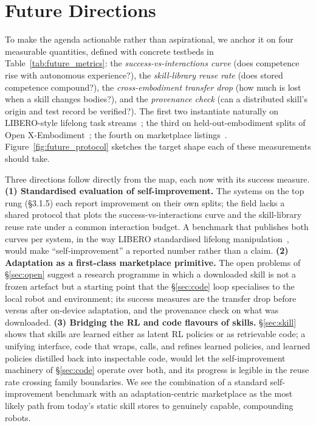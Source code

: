 \section{Future Directions}
\label{sec:future}

To make the agenda actionable rather than aspirational, we anchor it on four measurable
quantities, defined with concrete testbeds in Table~\ref{tab:future_metrics}: the
\emph{success-vs-interactions curve} (does competence rise with autonomous experience?), the
\emph{skill-library reuse rate} (does stored competence compound?), the \emph{cross-embodiment
transfer drop} (how much is lost when a skill changes bodies?), and the \emph{provenance check}
(can a distributed skill's origin and test record be verified?). The first two instantiate
naturally on LIBERO-style lifelong task streams~\citep{libero}; the third on held-out-embodiment
splits of Open X-Embodiment~\citep{openx}; the fourth on marketplace
listings~\citep{unistore2026}. Figure~\ref{fig:future_protocol} sketches the target shape each of
these measurements should take.




Three directions follow directly from the map, each now with its success measure.
\textbf{(1) Standardised evaluation of self-improvement.} The systems on the top rung
(\S3.1.5) each report improvement on their own splits; the field lacks a shared protocol that
plots the success-vs-interactions curve and the skill-library reuse rate under a common interaction
budget. A benchmark that publishes both curves per system, in the way LIBERO standardised
lifelong manipulation~\citep{libero}, would make ``self-improvement'' a reported number rather
than a claim. \textbf{(2) Adaptation as a first-class marketplace primitive.} The open problems
of \S\ref{sec:open} suggest a research programme in which a downloaded skill is not a frozen
artefact but a starting point that the \S\ref{sec:code} loop specialises to the local robot and
environment; its success measures are the transfer drop before versus after on-device
adaptation, and the provenance check on what was downloaded. \textbf{(3) Bridging the RL and
code flavours of skills.} \S\ref{sec:skill} shows that skills are learned either as latent RL
policies or as retrievable code; a unifying interface, code that wraps, calls, and refines
learned policies, and learned policies distilled back into inspectable code, would let the
self-improvement machinery of \S\ref{sec:code} operate over both, and its progress is legible in
the reuse rate crossing family boundaries. We see the combination of a standard self-improvement
benchmark with an adaptation-centric marketplace as the most likely path from today's static
skill stores to genuinely capable, compounding robots.
